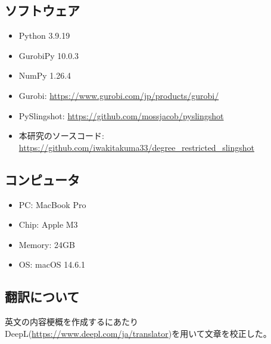 \documentclass[dvipdfmx,11pt]{kuisthesis}
\begin{document}
\Appendix[付録:本研究にて使用したソフトウェアとコンピュータ]
\subsection{ソフトウェア}\label{appsub-itemizing}


\begin{itemize}
  \renewcommand{\labelitemi}{}
  \item Python 3.9.19
  \item GurobiPy 10.0.3
  \item NumPy 1.26.4
\end{itemize}

\begin{itemize}
  \renewcommand{\labelitemi}{}
  \item Gurobi: \url{https://www.gurobi.com/jp/products/gurobi/}
  \item PySlingshot: \url{https://github.com/mossjacob/pyslingshot}
  \item 本研究のソースコード: \url{https://github.com/iwakitakuma33/degree_restricted_slingshot}
\end{itemize}

\subsection{コンピュータ}\label{appsub-itemizing2}
\begin{itemize}
  \renewcommand{\labelitemi}{}
  \item PC: MacBook Pro  
  \item Chip: Apple M3 
  \item Memory: 24GB 
  \item OS: macOS 14.6.1
\end{itemize}

\subsection{翻訳について}\label{translat}
英文の内容梗概を作成するにあたりDeepL(\url{https://www.deepl.com/ja/translator})を用いて文章を校正した。
\end{document}
